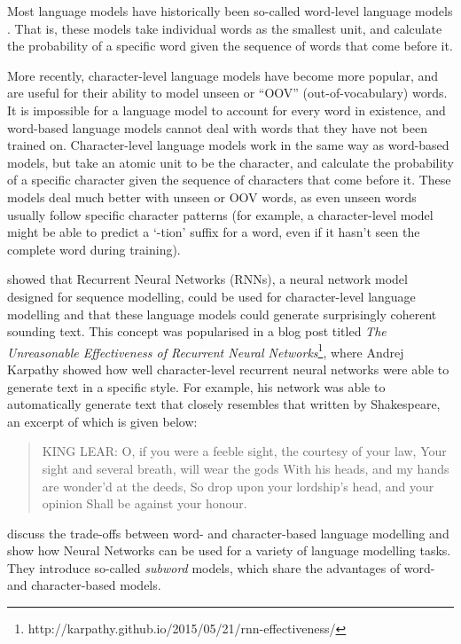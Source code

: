 Most language models have historically been so-called word-level language models \cite{mikolov2012subword}. That is, these models take individual words as the smallest unit, and calculate the probability of a specific word given the sequence of words that come before it. 

More recently, character-level language models have become more popular, and are useful for their ability to model unseen or ``OOV'' (out-of-vocabulary) words. It is impossible for a language model to account for every word in existence, and word-based language models cannot deal with words that they have not been trained on. Character-level language models work in the same way as word-based models, but take an atomic unit to be the character, and calculate the probability of a specific character given the sequence of characters that come before it. These models deal much better with unseen or OOV words, as even unseen words usually follow specific character patterns (for example, a character-level model might be able to predict a `-tion' suffix for a word, even if it hasn't seen the complete word during training). 

\citet{sutskever2011generating} showed that Recurrent Neural Networks (RNNs), a neural network model designed for sequence modelling, could be used for character-level language modelling and that these language models could generate surprisingly coherent sounding text. This concept was popularised in a blog post titled \textit{The Unreasonable Effectiveness of Recurrent Neural Networks}\footnote{http://karpathy.github.io/2015/05/21/rnn-effectiveness/}, where Andrej Karpathy showed how well character-level recurrent neural networks were able to generate text in a specific style. For example, his network was able to automatically generate text that closely resembles that written by Shakespeare, an excerpt of which is given below:

\begin{quote}
KING LEAR:
O, if you were a feeble sight, the courtesy of your law,
Your sight and several breath, will wear the gods
With his heads, and my hands are wonder'd at the deeds,
So drop upon your lordship's head, and your opinion
Shall be against your honour.
\end{quote}

\citet{mikolov2012subword} discuss the trade-offs between word- and character-based language modelling and show how Neural Networks can be used for a variety of language modelling tasks. They introduce so-called \textit{subword} models, which share the advantages of word- and character-based models.

